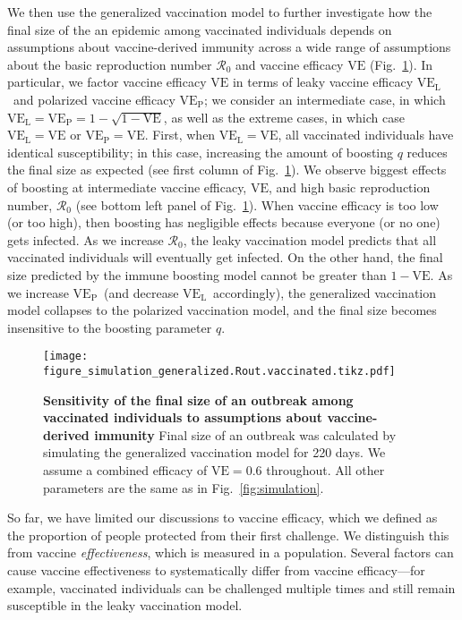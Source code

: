 \documentclass[12pt]{article}
\newcommand{\fref}[1]{Fig.~\ref{fig:#1}}
\newcommand{\VE}{\ensuremath{\mathrm{VE}}}
\newcommand{\VEP}{\ensuremath{\VE_{\mathrm{P}}}}
\newcommand{\VEL}{\ensuremath{\VE_{\mathrm{L}}}}
\begin{document}
We then use the generalized vaccination model to further investigate how the final size of the an epidemic among vaccinated individuals depends on assumptions about vaccine-derived immunity across a wide range of assumptions about the basic reproduction number $\mathcal R_0$ and vaccine efficacy $\VE$ (\fref{sensitivity}).
In particular, we factor vaccine efficacy $\VE$ in terms of leaky vaccine efficacy \VEL\ and polarized vaccine efficacy \VEP; we consider an intermediate case, in which $\VEL = \VEP = 1 - \sqrt{1-\VE}$, as well as the extreme cases, in which case $\VEL = \VE$ or $\VEP = \VE$.
First, when $\VEL = \VE$, all vaccinated individuals have identical susceptibility;
in this case, increasing the amount of boosting $q$ reduces the final size as expected (see first column of \fref{sensitivity}).
We observe biggest effects of boosting at intermediate vaccine efficacy, $\VE$, and high basic reproduction number, $\mathcal R_0$ (see bottom left panel of \fref{sensitivity}).
When vaccine efficacy is too low (or too high), then boosting has negligible effects because everyone (or no one) gets infected.
As we increase $\mathcal R_0$, the leaky vaccination model predicts that all vaccinated individuals will eventually get infected.
On the other hand, the final size predicted by the immune boosting model cannot be greater than $1-\VE$.
As we increase \VEP\ (and decrease \VEL\ accordingly), the generalized vaccination model collapses to the polarized vaccination model, and the final size becomes insensitive to the boosting parameter $q$.

\begin{figure}[!th]
\texttt{[image: figure\_simulation\_generalized.Rout.vaccinated.tikz.pdf]}
\caption{
\textbf{Sensitivity of the final size of an outbreak among vaccinated individuals to assumptions about vaccine-derived immunity}
Final size of an outbreak was calculated by simulating the generalized vaccination model for 220 days. 
We assume a combined efficacy of $\VE = 0.6$ throughout.
All other parameters are the same as in \fref{simulation}.
\label{fig:sensitivity}
}
\end{figure}

So far, we have limited our discussions to vaccine efficacy, which we defined as the proportion of people protected from their first challenge. 
We distinguish this from vaccine \textit{effectiveness}, which is measured in a population.
Several factors can cause vaccine effectiveness to systematically differ from vaccine efficacy---for example, vaccinated individuals can be challenged multiple times and still remain susceptible in the leaky vaccination model.
\end{document}
